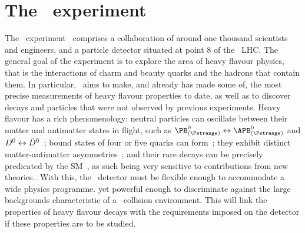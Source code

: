 \chapter{The \lhcb\ experiment}
\label{chap:intro:lhcb}

The \lhcb\ experiment~\cite{Alves:2008zz,Aaij:2014jba} comprises a 
collaboration of around one thousand scientists and engineers, and a particle 
detector situated at point 8 of the \cern\ \ac{LHC}.
The general goal of the experiment is to explore the area of heavy flavour 
physics, that is the interactions of charm and beauty quarks and the hadrons 
that contain them.
In particular, \lhcb\ aims to make, and already has made some of, the most 
precise measurements of heavy flavour properties to date, as well as to 
discover decays and particles that were not observed by previous experiments.
Heavy flavour has a rich phenomenology: neutral particles can oscillate between 
their matter and antimatter states in flight, such as $\PBds \leftrightarrow 
\APBds$ and $D^{0} \leftrightarrow 
\bar{D}^{0}$~\cite{Abulencia:2006ze,Aaij:2012nva}; bound states of four or five 
quarks can form~\cite{Aaij:2014jqa,Aaij:2015tga}; they exhibit distinct 
matter-antimatter 
asymmetries~\cite{Aubert:2001nu,Abe:2001xe,Aaij:2012kz,Aaij:2013iua,Aaij:2016cla}; 
and their rare decays can be precisely predicated by the 
\ac{SM}~\cite{CMS:2014xfa,Aaij:2015oid}, as such being very sensitive to 
contributions from new theories..
With this, the \lhcb\ detector must be flexible enough to accommodate a wide 
physics programme. yet powerful enough to discriminate against the large 
backgrounds characteristic of a \pp\ collision environment.
This  will link the properties of heavy flavour 
decays with the requirements imposed on the detector if these properties are to 
be studied.

